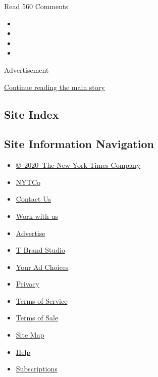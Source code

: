 Read 560 Comments

\begin{itemize}
\item
\item
\item
\item
\end{itemize}

Advertisement

\protect\hyperlink{after-bottom}{Continue reading the main story}

\hypertarget{site-index}{%
\subsection{Site Index}\label{site-index}}

\hypertarget{site-information-navigation}{%
\subsection{Site Information
Navigation}\label{site-information-navigation}}

\begin{itemize}
\tightlist
\item
  \href{https://help.nytimes3xbfgragh.onion/hc/en-us/articles/115014792127-Copyright-notice}{©~2020~The
  New York Times Company}
\end{itemize}

\begin{itemize}
\tightlist
\item
  \href{https://www.nytco.com/}{NYTCo}
\item
  \href{https://help.nytimes3xbfgragh.onion/hc/en-us/articles/115015385887-Contact-Us}{Contact
  Us}
\item
  \href{https://www.nytco.com/careers/}{Work with us}
\item
  \href{https://nytmediakit.com/}{Advertise}
\item
  \href{http://www.tbrandstudio.com/}{T Brand Studio}
\item
  \href{https://www.nytimes3xbfgragh.onion/privacy/cookie-policy\#how-do-i-manage-trackers}{Your
  Ad Choices}
\item
  \href{https://www.nytimes3xbfgragh.onion/privacy}{Privacy}
\item
  \href{https://help.nytimes3xbfgragh.onion/hc/en-us/articles/115014893428-Terms-of-service}{Terms
  of Service}
\item
  \href{https://help.nytimes3xbfgragh.onion/hc/en-us/articles/115014893968-Terms-of-sale}{Terms
  of Sale}
\item
  \href{https://spiderbites.nytimes3xbfgragh.onion}{Site Map}
\item
  \href{https://help.nytimes3xbfgragh.onion/hc/en-us}{Help}
\item
  \href{https://www.nytimes3xbfgragh.onion/subscription?campaignId=37WXW}{Subscriptions}
\end{itemize}
